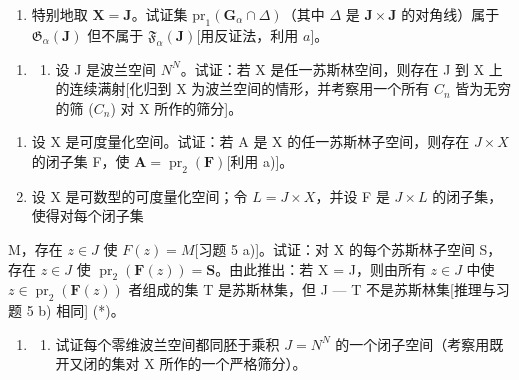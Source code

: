 \begin{enumerate}
\def\labelenumi{\alph{enumi})}
\setcounter{enumi}{1}
\tightlist
\item
  特别地取 \(\mathbf{X} = \mathbf{J}\)。试证集 \(\mathrm{pr}_1(\mathbf{G}_\alpha \cap \Delta)\)（其中 \(\Delta\) 是 \(\mathbf{J} \times \mathbf{J}\) 的对角线）属于 \(\mathfrak{G}_{\alpha}(\mathbf{J})\) 但不属于 \(\mathfrak{F}_{\alpha}(\mathbf{J})\){[}用反证法，利用 \(a\){]}。
\end{enumerate}

\begin{enumerate}
\def\labelenumi{\arabic{enumi})}
\setcounter{enumi}{5}
\tightlist
\item
  \begin{enumerate}
  \def\labelenumii{\alph{enumii})}
  \tightlist
  \item
    设 J 是波兰空间 \(N^{N}\)。试证：若 X 是任一苏斯林空间，则存在 J 到 X 上的连续满射{[}化归到 X 为波兰空间的情形，并考察用一个所有 \(C_{n}\) 皆为无穷的筛 (\(C_{n}\)) 对 X 所作的筛分{]}。
  \end{enumerate}
\end{enumerate}

\begin{enumerate}
\def\labelenumi{\alph{enumi})}
\setcounter{enumi}{1}
\item
  设 X 是可度量化空间。试证：若 A 是 X 的任一苏斯林子空间，则存在 \(J \times X\) 的闭子集 F，使 \(\mathbf{A} = \operatorname{pr}_{2}(\mathbf{F})\){[}利用 a){]}。
\item
  设 X 是可数型的可度量化空间；令 \(L = J \times X\)，并设 F 是 \(J \times L\) 的闭子集，使得对每个闭子集
\end{enumerate}

M，存在 \(z \in J\) 使 \(F(z) = M\){[}习题 5 a){]}。试证：对 X 的每个苏斯林子空间 S，存在 \(z \in J\) 使 \(\operatorname{pr}_{2}(\mathbf{F}(z)) = \mathbf{S}\)。由此推出：若 X = J，则由所有 \(z \in J\) 中使 \(z \in \operatorname{pr}_{2}(\mathbf{F}(z))\) 者组成的集 T 是苏斯林集，但 J --- T 不是苏斯林集{[}推理与习题 5 b) 相同{]} (*)。

\begin{enumerate}
\def\labelenumi{\arabic{enumi})}
\setcounter{enumi}{6}
\tightlist
\item
  \begin{enumerate}
  \def\labelenumii{\alph{enumii})}
  \tightlist
  \item
    试证每个零维波兰空间都同胚于乘积 \(J = N^{N}\) 的一个闭子空间（考察用既开又闭的集对 X 所作的一个严格筛分）。
  \end{enumerate}
\end{enumerate}

